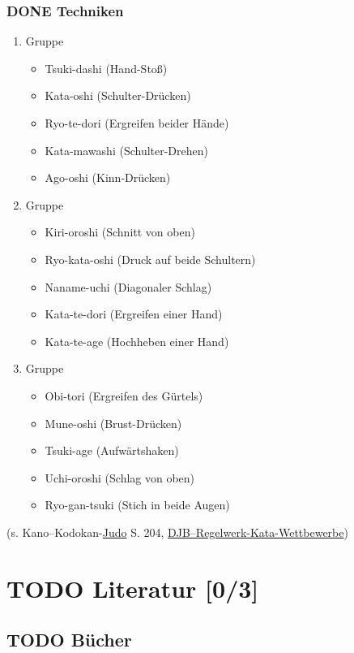 \documentclass[11pt]{article}
\begin{document}
\subsubsection{{\bfseries\sffamily DONE} Techniken}
\label{sec:org572ae2a}
\begin{enumerate}
\item Gruppe
\begin{itemize}
\item Tsuki-dashi (Hand-Stoß)
\item Kata-oshi (Schulter-Drücken)
\item Ryo-te-dori (Ergreifen beider Hände)
\item Kata-mawashi (Schulter-Drehen)
\item Ago-oshi (Kinn-Drücken)
\end{itemize}
\item Gruppe
\begin{itemize}
\item Kiri-oroshi (Schnitt von oben)
\item Ryo-kata-oshi (Druck auf beide Schultern)
\item Naname-uchi (Diagonaler Schlag)
\item Kata-te-dori (Ergreifen einer Hand)
\item Kata-te-age (Hochheben einer Hand)
\end{itemize}
\item Gruppe
\begin{itemize}
\item Obi-tori (Ergreifen des Gürtels)
\item Mune-oshi (Brust-Drücken)
\item Tsuki-age (Aufwärtshaken)
\item Uchi-oroshi (Schlag von oben)
\item Ryo-gan-tsuki (Stich in beide Augen)
\end{itemize}
\end{enumerate}

(s. Kano--Kodokan-\hyperref[org5f8b831]{Judo} S. 204, \href{https://www.judobund.de/fileadmin/\_horusdam/897-DJB-Regelwerk\_Kata-Wettbewerbe-IJF2015.pdf}{DJB--Regelwerk-Kata-Wettbewerbe})

\section{{\bfseries\sffamily TODO} Literatur [0/3]}
\label{sec:orge05dd69}

\subsection{{\bfseries\sffamily TODO} Bücher}
\label{sec:org6fd8920}
\end{document}
